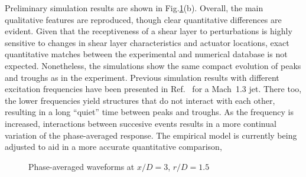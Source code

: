 \documentclass[english]{aiaa-tc}
\begin{document}
Preliminary simulation results are shown in Fig.\ref{phase}(b).
Overall, the main qualitative features are reproduced, though clear
quantitative differences are evident.  Given that the receptiveness of
a shear layer to perturbations is highly sensitive to changes in shear
layer characteristics and actuator locations, exact quantitative
matches between the experimental and numerical database is not
expected.  Nonetheless, the simulations show the same compact
evolution of peaks and troughs as in the experiment.  Previous
simulation results with different excitation frequencies have been
presented in Ref.~\cite{spethASME2013} for a Mach~1.3 jet.  There too,
the lower frequencies yield structures that do not interact with each
other, resulting in a long ``quiet'' time between peaks and troughs.
As the frequency is increased, interactions between succesive events
results in a more continual variation of the phase-averaged response.
The empirical model is
currently  being adjusted to aid in a more accurate quantitative comparison,  
\begin{figure}
\centering{}\caption{Phase-averaged waveforms at $x/D = 3$, $r/D = 1.5$}\label{phase}
\end{figure}
\end{document}
